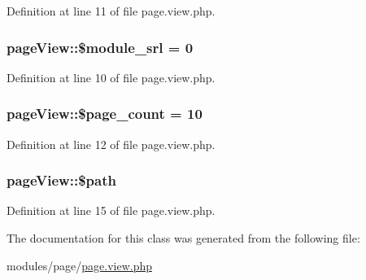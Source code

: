 Definition at line 11 of file page.\-view.\-php.

\hypertarget{classpageView_add2f52835c01c951adb6b79453417cdf}{
\subsubsection[{\$module\-\_\-srl}]{\setlength{\rightskip}{0pt plus 5cm}page\-View\-::\$module\-\_\-srl = 0}}\label{classpageView_add2f52835c01c951adb6b79453417cdf}


Definition at line 10 of file page.\-view.\-php.

\hypertarget{classpageView_a2f62b83f9128e0ccbec4a02dbb46962a}{
\subsubsection[{\$page\-\_\-count}]{\setlength{\rightskip}{0pt plus 5cm}page\-View\-::\$page\-\_\-count = 10}}\label{classpageView_a2f62b83f9128e0ccbec4a02dbb46962a}


Definition at line 12 of file page.\-view.\-php.

\hypertarget{classpageView_ac629942e1cd4eacbca09412968f4c8e3}{
\subsubsection[{\$path}]{\setlength{\rightskip}{0pt plus 5cm}page\-View\-::\$path}}\label{classpageView_ac629942e1cd4eacbca09412968f4c8e3}


Definition at line 15 of file page.\-view.\-php.



The documentation for this class was generated from the following file\-:\begin{DoxyCompactItemize}
\item 
modules/page/\hyperlink{page_8view_8php}{page.\-view.\-php}\end{DoxyCompactItemize}
